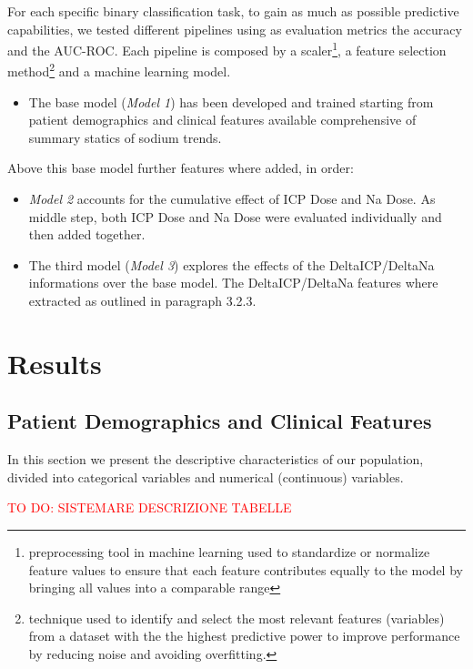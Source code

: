 For each specific binary classification task, to gain as much as possible predictive capabilities, we tested different pipelines using as evaluation metrics the accuracy and the AUC-ROC.
Each pipeline is composed by a scaler\footnote{preprocessing tool in machine learning used to standardize or normalize feature values to ensure that each feature contributes equally to the model by bringing all values into a comparable range}, a feature selection method\footnote {technique used to identify and select the most relevant features (variables) from a dataset with the the highest predictive power to improve performance by reducing noise and avoiding overfitting.} and a machine learning model.
\begin{itemize}
	\item The base model (\textit{Model 1}) has been developed and trained starting from patient demographics and clinical features available comprehensive of summary statics of sodium trends. 
\end{itemize}

Above this base model further features where added, in order:

\begin{itemize}
	\item \textit {Model 2} accounts for the cumulative effect of ICP Dose and Na Dose. As middle step,  both ICP Dose and Na Dose were evaluated individually and then added together.
	\item The third model (\textit{Model 3}) explores the effects of the DeltaICP/DeltaNa informations over the base model. The DeltaICP/DeltaNa features where extracted as outlined in paragraph 3.2.3. 
\end{itemize}

\section {Results}
\subsection{Patient Demographics and Clinical Features}
In this section we present the descriptive characteristics of our population, divided into  categorical variables and numerical (continuous) variables.

\textcolor{red}{TO DO: SISTEMARE DESCRIZIONE TABELLE}

